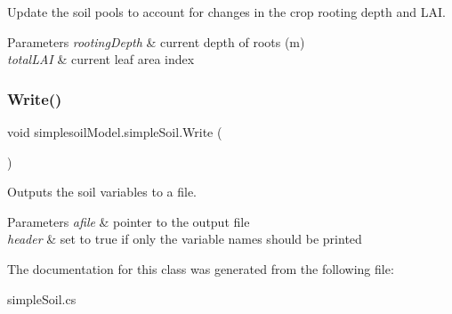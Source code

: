 Update the soil pools to account for changes in the crop rooting depth and L\+AI. 


\begin{DoxyParams}{Parameters}
{\em rooting\+Depth} & current depth of roots (m) \\
\hline
{\em total\+L\+AI} & current leaf area index \\
\hline
\end{DoxyParams}
\mbox{\label{classsimplesoil_model_1_1simple_soil_a8e716d4ae99f278b1bf013e04e0de57c}} 
\subsubsection{\texorpdfstring{Write()}{Write()}}
{\footnotesize\ttfamily void simplesoil\+Model.\+simple\+Soil.\+Write (\begin{DoxyParamCaption}{ }\end{DoxyParamCaption})\hspace{0.3cm}{\ttfamily [inline]}}



Outputs the soil variables to a file. 


\begin{DoxyParams}{Parameters}
{\em afile} & pointer to the output file \\
\hline
{\em header} & set to true if only the variable names should be printed \\
\hline
\end{DoxyParams}


The documentation for this class was generated from the following file\+:\begin{DoxyCompactItemize}
\item 
simple\+Soil.\+cs\end{DoxyCompactItemize}
